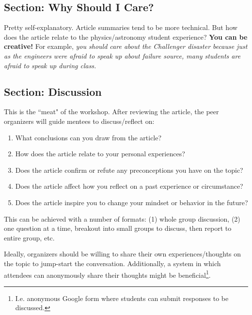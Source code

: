 \documentclass[addpoints,12pt]{exam}
\numberwithin{equation}{section}
\begin{document}
	\subsection{Section: Why Should I Care?}
	
	Pretty self-explanatory. Article summaries tend to be more technical. But how does the article relate to the physics/astronomy student experience? \textbf{You can be creative!} For example, \textit{you should care about the Challenger disaster because just as the engineers were afraid to speak up about failure source, many students are afraid to speak up during class.}
	
	\subsection{Section: Discussion}
	
	This is the ``meat" of the workshop. After reviewing the article, the peer organizers will guide mentees to discuss/reflect on:
	\begin{enumerate}
		\item What conclusions can you draw from the article?
		\item How does the article relate to your personal experiences?
		\item Does the article confirm or refute any preconceptions you have on the topic?
		\item Does the article affect how you reflect on a past experience or circumstance?
		\item Does the article inspire you to change your mindset or behavior in the future?
	\end{enumerate}

	This can be achieved with a number of formats: (1) whole group discussion, (2) one question at a time, breakout into small groups to discuss, then report to entire group, etc.
	
	Ideally, organizers should be willing to share their own experiences/thoughts on the topic to jump-start the conversation. Additionally, a system in which attendees can anonymously share their thoughts might be beneficial\footnote{I.e. anonymous Google form where students can submit responses to be discussed.}.	
	
	
	
	\nocite{*}
\end{document}
